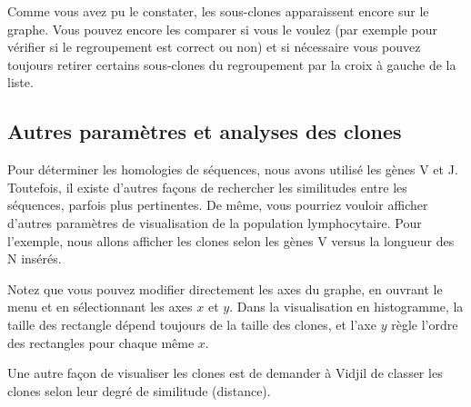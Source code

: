 \documentclass[10pt]{article}
\begin{document}
{Comme vous avez pu le constater, les sous-clones apparaissent encore sur
le graphe. Vous pouvez encore les comparer si vous le voulez (par
exemple pour vérifier si le regroupement est correct ou non) et si nécessaire
vous pouvez toujours retirer certains sous-clones du regroupement par la croix
à gauche de la liste.






\subsection{Autres paramètres et analyses des clones}

Pour déterminer les homologies de séquences, nous avons utilisé
les gènes V et J. Toutefois, il existe d'autres façons de
rechercher les similitudes entre les séquences, parfois plus
pertinentes. De même, vous pourriez vouloir afficher d'autres paramètres
de visualisation de la population lymphocytaire. Pour l'exemple, nous
allons afficher les clones selon les gènes V versus la longueur
des N insérés.


Notez que vous pouvez modifier directement les axes du graphe, en ouvrant le
menu  et en sélectionnant les axes $x$ et $y$.
Dans la visualisation en histogramme, la taille des
rectangle dépend toujours de la taille des clones, et l'axe $y$ règle l'ordre
des rectangles pour chaque même $x$.


Une autre façon de visualiser les clones est de demander à Vidjil de
classer les clones selon leur degré de similitude (distance).

}
\end{document}
